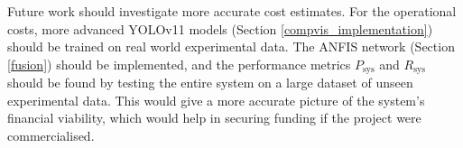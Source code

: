 Future work should investigate more accurate cost estimates. For the operational costs, more advanced YOLOv11 models (Section \ref{compvis_implementation}) should be trained on real world experimental data. The ANFIS network (Section \ref{fusion}) should be implemented, and the performance metrics $P_\text{sys}$ and $R_\text{sys}$ should be found by testing the entire system on a large dataset of unseen experimental data. This would give a more accurate picture of the system's financial viability, which would help in securing funding if the project were commercialised.

